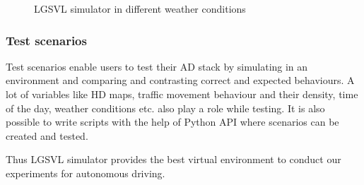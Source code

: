 \begin{figure}[h]
    \centering
    \def\svgwidth{\textwidth}
    
    \caption{LGSVL simulator in different weather conditions}
    \label{fig:weatherconditions}
\end{figure}

\subsubsection*{Test scenarios}
Test scenarios enable users to test their AD stack by simulating in an environment and
comparing and contrasting correct and expected behaviours. A lot of variables like HD maps,
traffic movement behaviour and their density, time of the day, weather conditions etc. also
play a role while testing. It is also possible to write scripts with the help of Python
API where scenarios can be created and tested.

Thus LGSVL simulator \cite{rong2020lgsvl} provides the best virtual environment to conduct our experiments for
autonomous driving.
